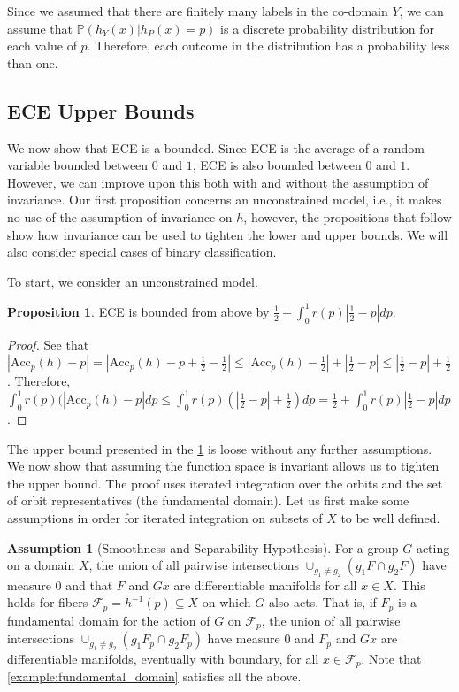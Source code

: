 \documentclass[10pt]{article} %
\theoremstyle{definition}
\newtheorem{proposition}{Proposition}
\newtheorem{assume}{Assumption}
\newcommand{\Acc}{\mathrm{Acc}_p(h)}
\begin{document}
Since we assumed that there are finitely many labels in the co-domain $Y$, we can assume that $\mathbb{P}\left(h_Y(x) | h_P(x) = p \right)$ is a discrete probability distribution for each value of $p$. Therefore, each outcome in the distribution has a probability less than one.

\subsection{ECE Upper Bounds} We now show that ECE is a bounded. Since ECE is the average of a random variable bounded between $0$ and $1$, ECE is also bounded between $0$ and $1$. However, we can improve upon this both with and without the assumption of invariance. Our first proposition concerns an unconstrained model, i.e., it makes no use of the assumption of invariance on $h$, however, the propositions that follow show how invariance can be used to tighten the lower and upper bounds. We will also consider special cases of binary classification.

To start, we consider an unconstrained model. 

\begin{proposition} \label{prop:naive}
ECE is bounded from above by $\frac{1}{2} + \int_0^{1}r(p)|\frac{1}{2} - p|dp$.
\end{proposition}

\begin{proof}
See that $|\Acc - p| = |\Acc - p + \frac{1}{2} - \frac{1}{2}| \leq |\Acc - \frac{1}{2}| + |\frac{1}{2} - p| \leq |\frac{1}{2} - p| + \frac{1}{2}$. Therefore, $\int_0^1 r(p)(|\Acc - p|  dp \leq \int_0^1 r(p)\left(|\frac{1}{2} - p| + \frac{1}{2} \right)dp = \frac{1}{2} + \int_0^{1}r(p)|\frac{1}{2} - p|dp$.
\end{proof}

The upper bound presented in the  \cref{prop:naive} is loose without any further assumptions. We now show that assuming the function space is invariant allows us to tighten the upper bound. The proof uses iterated integration over the orbits and the set of orbit representatives (the fundamental domain). Let us first make some assumptions in order for iterated integration on subsets of $X$ to be well defined.

\begin{assume}[Smoothness and Separability Hypothesis] \label{assumption:assume}
For a group $G$ acting on a domain $X$, the union of all pairwise intersections $\cup _{g_1 \neq g_2} (g_1F \cap g_2F)$ have measure $0$ and that $F$ and $Gx$ are differentiable manifolds for all $x \in X$. This holds for fibers $\mathcal{F}_p = h^{-1}(p) \subseteq X$ on which $G$ also acts. That is, if $F_p$ is a fundamental domain for the action of $G$ on $\mathcal{F}_p$, the union of all pairwise intersections $\cup _{g_1 \neq g_2} (g_1F_p \cap g_2F_p)$ have measure $0$ and $F_p$ and $Gx$ are differentiable manifolds, eventually with boundary, for all $x \in \mathcal{F}_p$. Note that \cref{example:fundamental_domain} satisfies all the above.
\end{assume}
\end{document}
